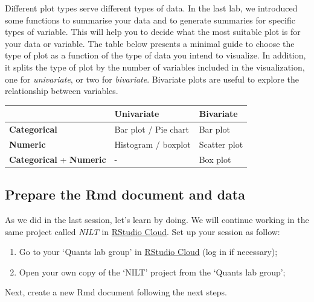\documentclass[
]{book}
\providecommand{\tightlist}{%
  \setlength{\itemsep}{0pt}\setlength{\parskip}{0pt}}
\begin{document}
Different plot types serve different types of data. In the last lab, we introduced some functions to summarise your data and to generate summaries for specific types of variable. This will help you to decide what the most suitable plot is for your data or variable. The table below presents a minimal guide to choose the type of plot as a function of the type of data you intend to visualize. In addition, it splits the type of plot by the number of variables included in the visualization, one for \emph{univariate}, or two for \emph{bivariate}. Bivariate plots are useful to explore the relationship between variables.

\begin{longtable}[]{@{}lll@{}}
\toprule\noalign{}
& \textbf{Univariate} & \textbf{Bivariate} \\
\midrule\noalign{}
\endhead
\bottomrule\noalign{}
\endlastfoot
\textbf{Categorical} & Bar plot / Pie chart & Bar plot \\
\textbf{Numeric} & Histogram / boxplot & Scatter plot \\
\textbf{Categorical} + \textbf{Numeric} & - & Box plot \\
\end{longtable}

\hypertarget{prepare-the-rmd-document-and-data}{%
\subsection{Prepare the Rmd document and data}\label{prepare-the-rmd-document-and-data}}

As we did in the last session, let's learn by doing. We will continue working in the same project called \emph{NILT} in \href{https://rstudio.cloud/}{RStudio Cloud}. Set up your session as follow:

\begin{enumerate}
\def\labelenumi{\arabic{enumi}.}
\tightlist
\item
  Go to your `Quants lab group' in \href{https://rstudio.cloud/}{RStudio Cloud} (log in if necessary);
\item
  Open your own copy of the `NILT' project from the `Quants lab group';
\end{enumerate}

Next, create a new Rmd document following the next steps.
\end{document}
